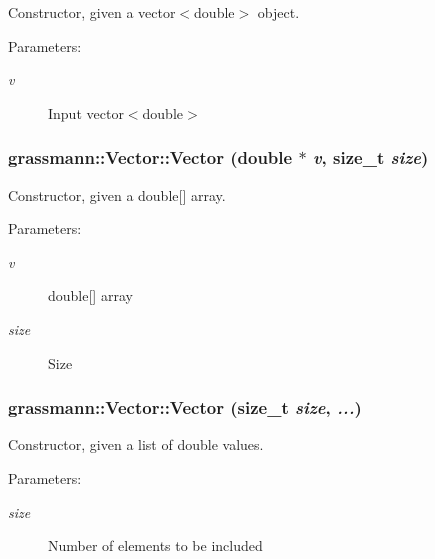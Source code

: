 Constructor, given a vector$<$double$>$ object. 

\begin{Desc}
\item[Parameters:]
\begin{description}
\item[{\em v}]Input vector$<$double$>$ \end{description}
\end{Desc}
\hypertarget{classgrassmann_1_1Vector_5d7bb89bb3d2d8aa26309ca97ddcad66}{
\subsubsection[Vector]{\setlength{\rightskip}{0pt plus 5cm}grassmann::Vector::Vector (double $\ast$ {\em v}, \/  size\_\-t {\em size})}}
\label{classgrassmann_1_1Vector_5d7bb89bb3d2d8aa26309ca97ddcad66}


Constructor, given a double\mbox{[}\mbox{]} array. 

\begin{Desc}
\item[Parameters:]
\begin{description}
\item[{\em v}]double\mbox{[}\mbox{]} array \item[{\em size}]Size \end{description}
\end{Desc}
\hypertarget{classgrassmann_1_1Vector_62ece542ba7c51a22866f6b8514f33ef}{
\subsubsection[Vector]{\setlength{\rightskip}{0pt plus 5cm}grassmann::Vector::Vector (size\_\-t {\em size}, \/   {\em ...})}}
\label{classgrassmann_1_1Vector_62ece542ba7c51a22866f6b8514f33ef}


Constructor, given a list of double values. 

\begin{Desc}
\item[Parameters:]
\begin{description}
\item[{\em size}]Number of elements to be included \end{description}
\end{Desc}


